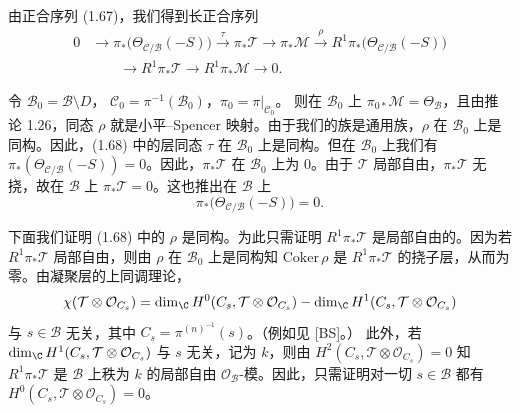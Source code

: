 由正合序列 (1.67)，我们得到长正合序列
\begin{align}
0&\to\pi_*\big(\Theta_{\mathcal{C}/\mathcal{B}}(-S)\big)
\xrightarrow{\ \tau\ }\pi_*\mathcal{T}\to\pi_*\mathcal{M}
\xrightarrow{\ \rho\ }R^1\pi_*\big(\Theta_{\mathcal{C}/\mathcal{B}}(-S)\big)
\tag{1.68}\\
&\qquad\to R^1\pi_*\mathcal{T}\to R^1\pi_*\mathcal{M}\to 0.
\nonumber
\end{align}

令 $\mathcal{B}_0=\mathcal{B}\setminus D$，
$\mathcal{C}_0=\pi^{-1}(\mathcal{B}_0)$，$\pi_0=\pi|_{\mathcal{C}_0}$。
则在 $\mathcal{B}_0$ 上 $\pi_{0*}\mathcal{M}=\Theta_{\mathcal{B}}$，且由推论
1.26，同态 $\rho$ 就是小平–Spencer 映射。由于我们的族是通用族，$\rho$ 在
$\mathcal{B}_0$ 上是同构。因此，(1.68) 中的层同态 $\tau$ 在 $\mathcal{B}_0$
上是同构。但在 $\mathcal{B}_0$ 上我们有
$\pi_*(\Theta_{\mathcal{C}/\mathcal{B}}(-S))=0$。因此，$\pi_*\mathcal{T}$
在 $\mathcal{B}_0$ 上为 $0$。由于 $\mathcal{T}$ 局部自由，$\pi_*\mathcal{T}$
无挠，故在 $\mathcal{B}$ 上 $\pi_*\mathcal{T}=0$。这也推出在 $\mathcal{B}$ 上
\begin{equation}
\pi_*\big(\Theta_{\mathcal{C}/\mathcal{B}}(-S)\big)=0. \tag{1.69}
\end{equation}

下面我们证明 (1.68) 中的 $\rho$ 是同构。为此只需证明 $R^1\pi_*\mathcal{T}$
是局部自由的。因为若 $R^1\pi_*\mathcal{T}$ 局部自由，则由 $\rho$ 在
$\mathcal{B}_0$ 上是同构知 $\mathrm{Coker}\,\rho$ 是 $R^1\pi_*\mathcal{T}$
的挠子层，从而为零。由凝聚层的上同调理论，
\[
\chi(\mathcal{T}\otimes\mathcal{O}_{C_s})
=\dim_{\C}H^0(C_s,\mathcal{T}\otimes\mathcal{O}_{C_s})
-\dim_{\C}H^1(C_s,\mathcal{T}\otimes\mathcal{O}_{C_s})
\]
与 $s\in\mathcal{B}$ 无关，其中 $C_s=\pi^{(n)^{-1}}(s)$。（例如见 [BS]。）
此外，若 $\dim_{\C}H^1(C_s,\mathcal{T}\otimes\mathcal{O}_{C_s})$ 与 $s$
无关，记为 $k$，则由 $H^2(C_s,\mathcal{T}\otimes\mathcal{O}_{C_s})=0$ 知
$R^1\pi_*\mathcal{T}$ 是 $\mathcal{B}$ 上秩为 $k$ 的局部自由
$\mathcal{O}_{\mathcal{B}}$-模。因此，只需证明对一切 $s\in\mathcal{B}$ 都有
$H^0(C_s,\mathcal{T}\otimes\mathcal{O}_{C_s})=0$。

